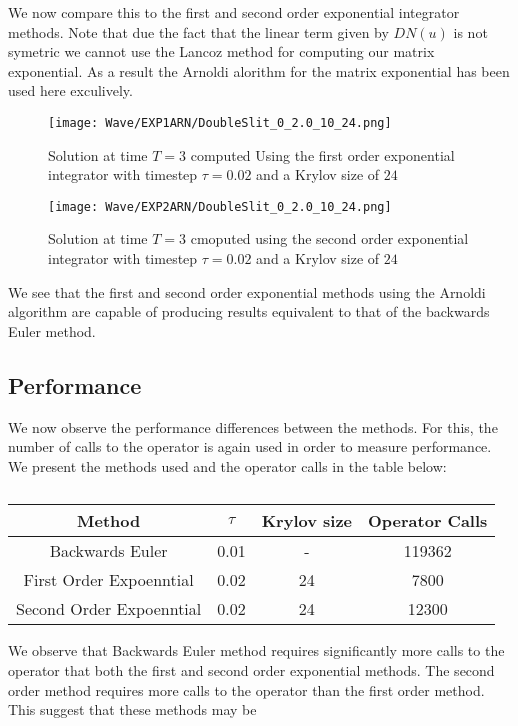We now compare this to the first and second order exponential integrator methods.
Note that due the fact that the linear term given by $DN(u)$ is not symetric we cannot use the Lancoz method for computing our matrix exponential.
As a result the Arnoldi alorithm for the matrix exponential has been used here exculively.
\begin{figure}[H]
    \centering
    \begin{minipage}{0.49\textwidth}
        \texttt{[image: Wave/EXP1ARN/DoubleSlit\_0\_2.0\_10\_24.png]} %
        \caption{Solution at time $T=3$ computed Using the first order exponential integrator with timestep $\tau = 0.02$ and a Krylov size of $24$}
        \label{fig:second order 16}
    \end{minipage}\hfill
    \centering
    \begin{minipage}{0.49\textwidth}
        \texttt{[image: Wave/EXP2ARN/DoubleSlit\_0\_2.0\_10\_24.png]} %
        \caption{Solution at time $T=3$ cmoputed using the second order exponential integrator with timestep $\tau = 0.02$ and a Krylov size of $24$}
        \label{fig:second order 32}
    \end{minipage}\hfill
\end{figure}

We see that the first and second order exponential methods using the Arnoldi algorithm are capable of producing results equivalent to that of the backwards Euler method.

\subsection{Performance}
We now observe the performance differences between the methods.
For this, the number of calls to the operator is again used in order to measure performance.
We present the methods used and the operator calls in the table below:

\begin{table}[H]
    \centering
    \begin{tabular}{| c | c | c | c |}
    \hline
    Method & $\tau$ & Krylov size & Operator Calls\\
    \hline
    Backwards Euler & 0.01 & - & 119362 \\
    First Order Expoenntial & 0.02 & 24 & 7800 \\
    Second Order Expoenntial & 0.02 & 24 & 12300 \\
    \hline
    \end{tabular}
    \caption{}
    \label{tab:reduced_data}
\end{table}

We observe that Backwards Euler method requires significantly more calls to the operator that both the first and second order exponential methods.
The second order method requires more calls to the operator than the first order method.
This suggest that these methods may be 